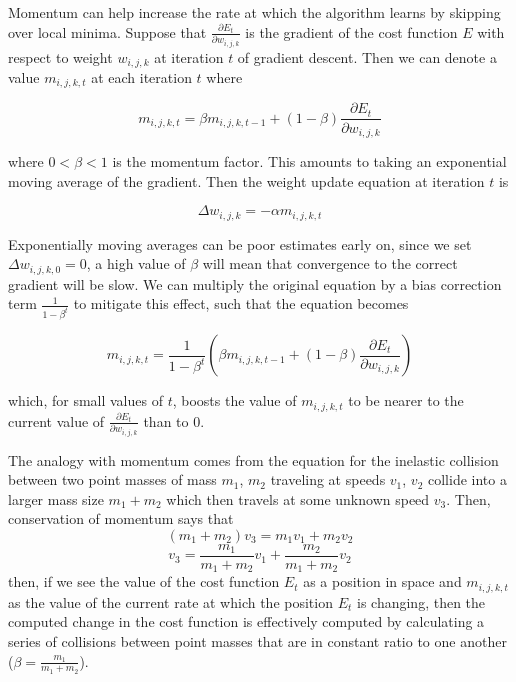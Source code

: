 Momentum can help increase the rate at which the algorithm learns by skipping over local minima. Suppose that $\frac{\partial E_t}{\partial w_{i,j,k}}$ is the gradient of the cost function $E$ with respect to weight $w_{i,j,k}$ at iteration $t$ of gradient descent. Then we can denote a value $m_{i,j,k,t}$ at each iteration $t$ where

\begin{equation}
m_{i,j,k,t} = \beta m_{i,j,k,t-1} + (1 - \beta) \frac{\partial E_t}{\partial w_{i,j,k}}
\end{equation}

where $0 < \beta < 1$ is the momentum factor. This amounts to taking an exponential moving average of the gradient. Then the weight update equation at iteration $t$ is

\begin{equation}
\Delta w_{i,j,k} = - \alpha m_{i,j,k,t}
\end{equation}

Exponentially moving averages can be poor estimates early on, since we set $\Delta w_{i,j,k,0} = 0$, a high value of $\beta$ will mean that convergence to the correct gradient will be slow. We can multiply the original equation by a bias correction term $\frac{1}{1-\beta^t}$ to mitigate this effect, such that the equation becomes 

\begin{equation}
m_{i,j,k,t} = \frac{1}{1-\beta^t} (\beta m_{i,j,k,t-1} + (1 - \beta) \frac{\partial E_t}{\partial w_{i,j,k}} )
\end{equation}

which, for small values of $t$, boosts the value of $m_{i,j,k,t}$ to be nearer to the current value of $\frac{\partial E_t}{\partial w_{i,j,k}}$ than to $0$.

The analogy with momentum comes from the equation for the inelastic collision between two point masses of mass $m_{1}$, $m_{2}$ traveling at speeds $v_{1}$, $v_{2}$ collide into a larger mass size $m_{1}+m_{2}$ which then travels at some unknown speed $v_{3}$. Then, conservation of momentum says that
\begin{equation}
(m_{1} + m_{2})v_{3} = m_{1} v_{1} + m_{2} v_{2}
\end{equation}
\begin{equation}
v_{3} = \frac{m_{1}}{m_{1} + m_{2}} v_{1} + \frac{m_{2}}{m_{1} + m_{2}} v_{2}
\end{equation}
then, if we see the value of the cost function $E_{t}$ as a position in space and $m_{i,j,k,t}$ as the value of the current rate at which the position $E_{t}$ is changing, then the computed change in the cost function is effectively computed by calculating a series of collisions between point masses that are in constant ratio to one another ($\beta = \frac{m_{1}}{m_{1} + m_{2}}$).